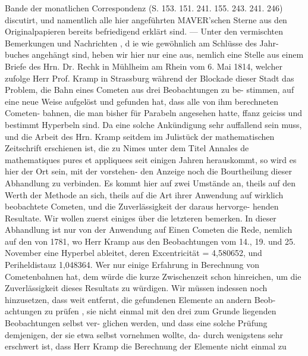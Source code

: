 \documentclass[12pt,a4paper]{article}
\begin{document}
Bande der monatlichen Correspondenz (S. 153. 151. 241. 155. 243. 241. 246) discutirt, und namentlich alle\newline
hier angeführten MAVER'schen Sterne aus den Originalpapieren bereits befriedigend erklärt sind. ---\newline
Unter den vermischten Bemerkungen und Nachrichten , d ie wie gewöhnlich am Schlüsse des Jahr-\newline
buches angehängt sind, heben wir hier nur eine aus, nemlich eine Stelle aus einem Briefe des Hrn.\newline
Dr. Rechk in Mühlheim am Rhein vom 6. Mai 1814, welcher zufolge Herr Prof. Kramp in Strassburg\newline
während der Blockade dieser Stadt das Problem, die Bahn eines Cometen aus drei Beobachtungen zu be-\newline
stimmen, auf eine neue Weise aufgelöst und gefunden hat, dass alle von ihm berechneten Cometen-\newline
bahnen, die man bisher für Parabeln angesehen hatte, ffanz geiciss und bestimmt Hyperbeln sind. Da\newline
eine solche Ankündigung sehr auffallend sein muss, und die Arbeit des Hrn. Kramp seitdem im Julistück\newline
der mathematischen Zeitschrift erschienen ist, die zu Nimes unter dem Titel Annales de mathematiques\newline
pures et appliquees seit einigen Jahren herauskommt, so wird es hier der Ort sein, mit der vorstehen-\newline
den Anzeige noch die Bourtheilung dieser Abhandlung zu verbinden.\newline
Es kommt hier auf zwei Umstände an, theils auf den Werth der Methode an sich, theils auf die\newline
Art ihrer Anwendung auf wirklich beobachtete Cometen, und die Zuverlässigkeit der daraus hervorge-\newline
henden Resultate. Wir wollen zuerst einiges über die letzteren bemerken. In dieser Abhandlung ist\newline
nur von der Anwendung auf Einen Cometen die Rede, nemlich auf den von 1781, wo Herr Kramp aus\newline
den Beobachtungen vom 14., 19. und 25. November eine Hyperbel ableitet, deren Excentricität = 4,580652,\newline
und Periheldistauz 1,048364. Wer nur einige Erfahrung in Berechnung von Cometenbahnen hat, dem\newline
würde die kurze Zwischenzeit schon hinreichen, um die Zuverlässigkeit dieses Resultats zu würdigen.\newline
Wir müssen indessen noch hinzusetzen, dass weit entfernt, die gefundenen Elemente an andern Beob-\newline
achtungen zu prüfen , sie nicht einmal mit den drei zum Grunde liegenden Beobachtungen selbst ver-\newline
glichen werden, und dass eine solche Prüfung demjenigen, der sie etwa selbst vornehmen wollte, da-\newline
durch wenigstens sehr erschwert ist, dass Herr Kramp die Berechnung der Elemente nicht einmal zu\newline
\end{document}
